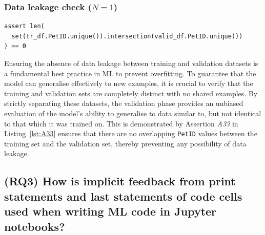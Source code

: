 
\subsubsection{Data leakage check ($N = 1$)}

\begin{lstlisting}[caption={Assertion \emph{A33} used to ensure that the training and validation sets do not contain any overlapping values.}, label={lst:A33}]
assert len(
  set(tr_df.PetID.unique()).intersection(valid_df.PetID.unique())
) == 0
\end{lstlisting}

Ensuring the absence of data leakage between training and validation datasets is a fundamental best practice in ML to prevent overfitting. To guarantee that the model can generalise effectively to new examples, it is crucial to verify that the training and validation sets are completely distinct with no shared examples. By strictly separating these datasets, the validation phase provides an unbiased evaluation of the model's ability to generalise to data similar to, but not identical to that which it was trained on. This is demonstrated by Assertion \emph{A33} in Listing~\ref{lst:A33} ensures that there are no overlapping \lstinline{PetID} values between the training set and the validation set, thereby preventing any possibility of data leakage.


\subsection{(RQ3) How is implicit feedback from print statements and last statements of code cells used when writing ML code in Jupyter notebooks?}~\label{sec:result-implicit}

